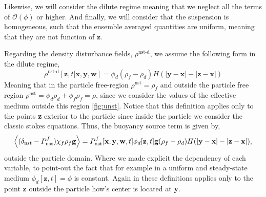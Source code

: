 Likewise, we will consider the dilute regime meaning that we neglect all the terms of $\mathcal{O}(\phi)$ or higher. 
And finally, we will consider that the suspension is homogeneous, such that the ensemble averaged quantities are uniform, meaning that they are not function of $\textbf{z}$. 


Regarding the density disturbance fields, $\rho^\text{nst-d}$, we assume the following form in the dilute regime, 
\begin{equation*}
    \rho^\text{nst-d}[\textbf{z},t|\textbf{x},\textbf{y},\textbf{w}]
    = \phi_d (\rho_f - \rho_d) H(|\textbf{y} - \textbf{x}| - |\textbf{z} - \textbf{x}|)
\end{equation*}
Meaning that in the particle free-region $\rho^\text{nst} = \rho_f$ and outside the particle free region $\rho^\text{nst} = \phi_d\rho_d + \phi_f\rho_f= \rho$, since we consider the values of the effective medium outside this region \ref{fig:unst}. 
Notice that this definition applies only to the points \textbf{z} exterior to the particle since inside the particle we consider the classic stokes equations. 
Thus, the buoyancy source term is given by, 
\begin{equation*}
    \left<(\delta_\text{nst} - P_\text{nst}^f) \chi_f \rho_f \textbf{g}\right>
    = 
    P_\text{nst}^f [\textbf{x},\textbf{y},\textbf{w},t]
    \phi_d[\textbf{z},t] 
    \textbf{g}
    (\rho_f - \rho_d) H(|\textbf{y} - \textbf{x}| - |\textbf{z} - \textbf{x}|), 
\end{equation*}
outside the particle domain. 
Where we made explicit the dependency of each variable, to point-out the fact that for example in a uniform and steady-state medium $\phi_d[\textbf{z},t] = \phi$ is constant. 
Again in these definitions applies only to the point \textbf{z} outside the particle how's center is located at \textbf{y}. 

